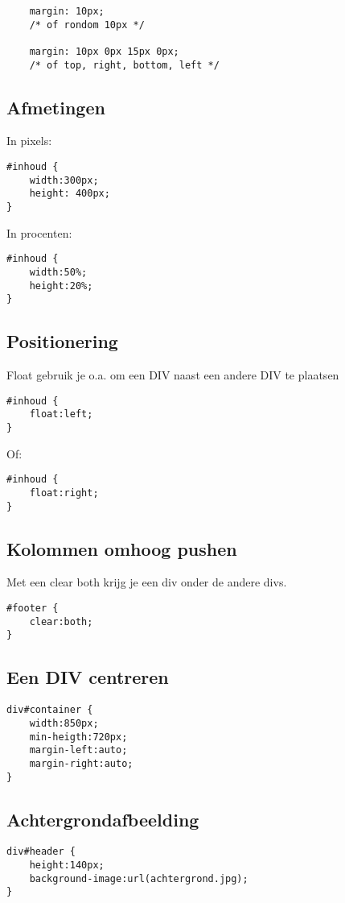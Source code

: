 \documentclass[8pt,pagesize,footinclude=false,headinclude=false]{scrartcl}
\begin{document}
\begin{multicols*}{4}
\begin{lstlisting}
	margin: 10px; 
	/* of rondom 10px */
	
	margin: 10px 0px 15px 0px; 
	/* of top, right, bottom, left */
\end{lstlisting}

\subsection*{Afmetingen}
In pixels:
\begin{lstlisting}
#inhoud {
	width:300px;
	height: 400px;
}
\end{lstlisting}

\noindent In procenten:
\begin{lstlisting}
#inhoud {
	width:50%;
	height:20%;
}
\end{lstlisting}

\subsection*{Positionering}
Float gebruik je o.a. om een DIV naast een andere DIV te plaatsen
\begin{lstlisting}
#inhoud {
	float:left;
}
\end{lstlisting}
\noindent Of:
\begin{lstlisting}
#inhoud {
	float:right;
}
\end{lstlisting}

\subsection*{Kolommen omhoog pushen}
Met een clear both krijg je een div onder de andere divs.
\begin{lstlisting}
#footer {
	clear:both;
}
\end{lstlisting}

\subsection*{Een DIV centreren}
\begin{lstlisting}
div#container {
	width:850px;
	min-heigth:720px;
	margin-left:auto;
	margin-right:auto;
}
\end{lstlisting}

\subsection*{Achtergrondafbeelding}
\begin{lstlisting}
div#header {
	height:140px;
	background-image:url(achtergrond.jpg);
}
\end{lstlisting}

\end{multicols*}
\end{document}

